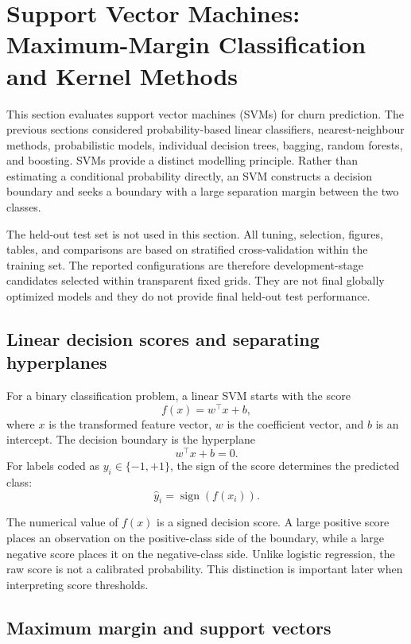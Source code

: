 \newpage
\section{Support Vector Machines: Maximum-Margin Classification and Kernel Methods}
\label{sec:support-vector-machines}

This section evaluates support vector machines (SVMs) for churn prediction. The previous sections considered probability-based linear classifiers, nearest-neighbour methods, probabilistic models, individual decision trees, bagging, random forests, and boosting. SVMs provide a distinct modelling principle. Rather than estimating a conditional probability directly, an SVM constructs a decision boundary and seeks a boundary with a large separation margin between the two classes.

The held-out test set is not used in this section. All tuning, selection, figures, tables, and comparisons are based on stratified cross-validation within the training set. The reported configurations are therefore development-stage candidates selected within transparent fixed grids. They are not final globally optimized models and they do not provide final held-out test performance.

\subsection{Linear decision scores and separating hyperplanes}

For a binary classification problem, a linear SVM starts with the score
\[
f(x) = w^\top x + b,
\]
where \(x\) is the transformed feature vector, \(w\) is the coefficient vector, and \(b\) is an intercept. The decision boundary is the hyperplane
\[
w^\top x + b = 0.
\]
For labels coded as \(y_i \in \{-1,+1\}\), the sign of the score determines the predicted class:
\[
\widehat{y}_i = \operatorname{sign}(f(x_i)).
\]

The numerical value of \(f(x)\) is a signed decision score. A large positive score places an observation on the positive-class side of the boundary, while a large negative score places it on the negative-class side. Unlike logistic regression, the raw score is not a calibrated probability. This distinction is important later when interpreting score thresholds.

\subsection{Maximum margin and support vectors}

